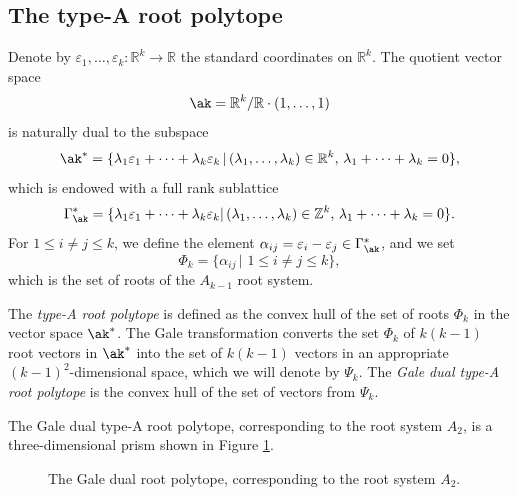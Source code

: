 \subsection{The type-A root polytope}\label{S4.1}
Denote by $\varepsilon_1, \ldots ,\varepsilon_k:\mathbb{R}^k\to\mathbb{R}$ 
the 
standard coordinates on  $\mathbb{R}^k$. The quotient vector space
$$\ak=\mathbb{R}^k/\mathbb{R}\cdot(1, \ldots ,1)$$
is naturally dual to the subspace
$$\ak^*=\{\lambda_1\varepsilon_1+\cdots+\lambda_k\varepsilon_k  \, | \,
(\lambda_1, \ldots ,\lambda_k)\in\mathbb{R}^k,\, 
\lambda_1+ \cdots +\lambda_k=0\},$$
which  is endowed with a full rank sublattice
$$\Gamma_{\ak}^* = 
\{\lambda_1\varepsilon_1+\cdots+\lambda_k\varepsilon_k| 
\,(\lambda_1, \ldots ,\lambda_k)\in\mathbb{Z}^k, 
\,\lambda_1+ \cdots +\lambda_k=0\}.$$
For $1\leq i\neq j\leq k$, we define the element $\alpha_{ij} = 
\varepsilon_i-\varepsilon_j \in\Gamma_{\ak}^*$, and we set
$$\Phi_k = \{\alpha_{ij} \, | \,\, 1\leq i\neq j\leq k\},$$ which is the set of 
roots of the $A_{k-1}$ root system. 

The \textit{type-A root polytope} is defined as the convex hull of the set of 
roots $\Phi_k$ in the vector space $\ak^*$. The Gale transformation converts 
the set $\Phi_k$ of $k(k-1)$ root 
vectors in $\ak^*$ into the set of $k(k-1)$ 
vectors in an appropriate $(k-1)^2$-dimensional space, which we will denote by $\Psi_k$. 
The \textit{Gale dual type-A root polytope} is the convex hull of the set of 
vectors from $\Psi_k$.

\begin{exam}\label{ex:prism}
The Gale dual type-A root polytope, corresponding to the root system $A_2$, is a three-dimensional prism shown in Figure \ref{fig1}.
\end{exam}
\begin{figure}[ht]
\centering
{}
\caption{The Gale dual root polytope, corresponding to the root system $A_2$.}\label{fig1}
\end{figure}

